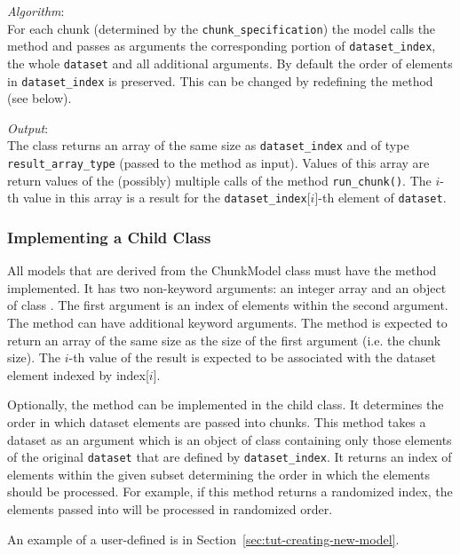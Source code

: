 {\it Algorithm}:~\\[1mm]
%
For each chunk (determined by the \verb|chunk_specification|) the model calls
the method  and passes as arguments the corresponding portion
of \verb|dataset_index|, the whole \verb|dataset| and all additional
arguments. By default the order of elements in \verb|dataset_index| is
preserved. This can be changed by redefining the method
 (see below). 

{\it Output}:~\\[1mm]
%
The class returns an array of the same size as \verb|dataset_index| and of type \verb|result_array_type| 
(passed to the method as input).
Values of this array are return values of the (possibly) multiple calls of the method \verb|run_chunk()|.
The $i$-th value in this array is a result for the \verb|dataset_index|[$i$]-th element of \verb|dataset|.

\subsubsection{Implementing a Child Class}
%
All models that are derived from the ChunkModel class must have the method  implemented. 
It has two non-keyword arguments: an integer array and an object of class . The first argument 
is an index of elements within the second argument. The method can have additional keyword arguments.  
The method is expected to return an array of the same size as the size of the first argument (i.e. the chunk size).
The $i$-th value of the result is expected to be associated with the dataset element indexed by index[$i$].

Optionally, the method   can be implemented in the child class. It determines the order in which 
dataset elements are passed into chunks. This method takes a dataset as an argument which is an
object of class  containing only those elements of the
original \verb|dataset| that are defined by \verb|dataset_index|.  It returns
an index of elements within the given subset determining the order in which the
elements should be processed. For example, if this method returns a randomized
index, the elements passed into  will be processed in
randomized order.

An example of a user-defined  is in Section~\ref{sec:tut-creating-new-model}.

